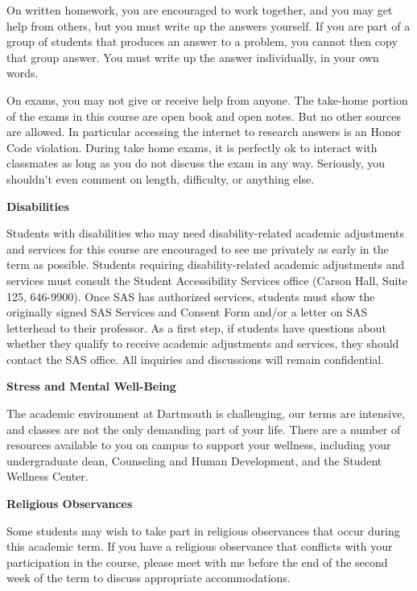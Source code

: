 \documentclass{article}
\begin{document}
    On written homework, you are encouraged to work together, and you may get
    help from others, but you must write up the answers yourself. If you
    are part of a group of students that produces an answer to a problem,
    you cannot then copy that group answer. You must write up the answer
    individually, in your own words.
    \par\hfill\par
    On exams, you may not give or receive help from anyone.
    The take-home portion of the exams in this course are open book and open
    notes. But no other sources are allowed. In particular accessing the
    internet to research answers is an Honor Code violation. During take home
    exams, it is perfectly ok to interact with classmates as long as you do not
    discuss the exam in any way. Seriously, you shouldn't even comment on
    length, difficulty, or anything else.
    \par\hfill\par
    \textbf{Disabilities}
    \par\hfill\par
    Students with disabilities who may need disability-related academic
    adjustments and services for this course are encouraged to see me privately
    as early in the term as possible. Students requiring disability-related
    academic adjustments and services must consult the Student Accessibility
    Services office (Carson Hall, Suite 125, 646-9900). Once SAS has authorized
    services, students must show the originally signed SAS Services and Consent
    Form and/or a letter on SAS letterhead to their professor. As a first step,
    if students have questions about whether they qualify to receive academic
    adjustments and services, they should contact the SAS office. All inquiries
    and discussions will remain confidential.
    \par\hfill\par
    \textbf{Stress and Mental Well-Being}
    \par\hfill\par
    The academic environment at Dartmouth is challenging, our terms are
    intensive, and classes are not the only demanding part of your life. There
    are a number of resources available to you on campus to support your
    wellness, including your undergraduate dean, Counseling and Human
    Development, and the Student Wellness Center.
    \par\hfill\par
    \textbf{Religious Observances}
    \par\hfill\par
    Some students may wish to take part in religious observances that occur
    during this academic term. If you have a religious observance that
    conflicts with your participation in the course, please meet with me before
    the end of the second week of the term to discuss appropriate
    accommodations.
\end{document}
